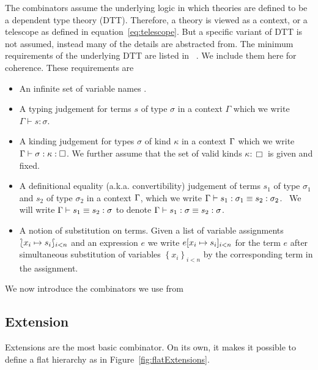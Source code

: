 The combinators assume the underlying logic in which theories are defined to be a dependent type theory (DTT). Therefore, a theory is viewed as a context, or a telescope as defined in equation~\ref{eq:telescope}. But a specific variant of DTT is not assumed, instead many of the details are abstracted from. The minimum requirements of the underlying DTT are listed in ~\cite{carette2018building}. We include them here for coherence. These requirements are 
\begin{itemize}
    \item An infinite set of variable names \vars.
    
    \item A typing judgement for terms $s$ of type $\sigma$ in a context
    $\Gamma$ which we write $\Gamma \vdash s : \sigma$.
    
    \item A kinding judgement for types $\sigma$ of kind $\kappa$ in a context
    $\Gamma$ which we write\\
    $\Gamma \vdash \sigma : \kappa : \Box$.  We further assume that the set
    of valid kinds $\kappa : \Box$ is given and fixed.
    
    \item A definitional equality (a.k.a. convertibility) judgement of terms
    $s_1$ of type $\sigma_1$ and $s_2$ of type $\sigma_2$ in a context $\Gamma$,
    which we write $\Gamma \vdash s_1 : \sigma_1 \equiv s_2 : \sigma_2$. \ We
    will write $\Gamma \vdash s_1 \equiv s_2 : \sigma$ to denote $\Gamma \vdash
    s_1 : \sigma \equiv s_2 : \sigma$.
    
    \item A notion of substitution on terms. Given a list of variable
    assignments $\lbag x_i \mapsto s_i \rbag_{i < n}$
    and an expression $e$ we write $e[ x_i \mapsto s_i ]_{i < n}$
    for the term $e$ after simultaneous substitution of variables $\left\{ x_i
    \right\}_{i < n}$ by the corresponding term in the assignment.
\end{itemize}

We now introduce the combinators we use from~\cite{carette2018building} 
\subsection{Extension} 
\label{subsec:extension}
Extensions are the most basic combinator. On its own, it makes it possible to define a flat hierarchy as in Figure~\ref{fig:flatExtensions}. 

